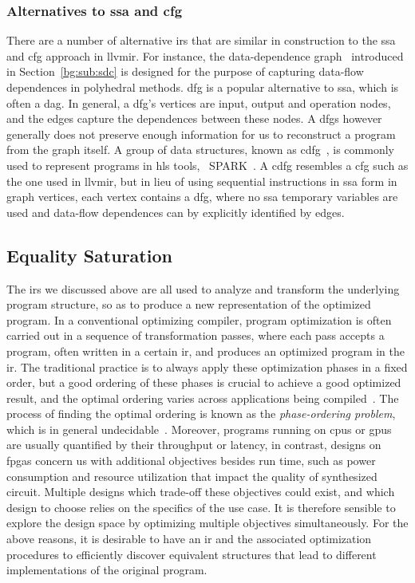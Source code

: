 \subsubsection{Alternatives to \gls{ssa} and \gls{cfg}}

There are a number of alternative \glspl{ir} that are similar in construction
to the \gls{ssa} and \gls{cfg} approach in \gls{llvmir}\@.  For instance, the
data-dependence graph~\cite{rau94} introduced in Section~\ref{bg:sub:sdc} is
designed for the purpose of capturing data-flow dependences in polyhedral
methods.  \Gls{dfg} is a popular alternative to \gls{ssa}, which is often
a \gls{dag}.  In general, a \gls{dfg}'s vertices are input, output and
operation nodes, and the edges capture the dependences between these nodes.
A \glspl{dfg} however generally does not preserve enough information for us
to reconstruct a program from the graph itself.  A group of data structures,
known as \gls{cdfg}~\cite{orailoglu86}, is commonly used to represent programs
in \gls{hls} tools, \eg~SPARK~\cite{gupta04}.  A \gls{cdfg} resembles a
\gls{cfg} such as the one used in \gls{llvmir}, but in lieu of using sequential
instructions in \gls{ssa} form in graph vertices, each vertex contains a
\gls{dfg}, where no \gls{ssa} temporary variables are used and data-flow
dependences can by explicitly identified by edges.


\subsection{Equality Saturation}
\label{bg:sub:equality_saturation}

The \glspl{ir} we discussed above are all used to analyze and transform the
underlying program structure, so as to produce a new representation of the
optimized program.  In a conventional optimizing compiler, program optimization
is often carried out in a sequence of transformation passes, where each pass
accepts a program, often written in a certain \gls{ir}, and produces an
optimized program in the \gls{ir}\@.  The traditional practice is to always
apply these optimization phases in a fixed order, but a good ordering of these
phases is crucial to achieve a good optimized result, and the optimal ordering
varies across applications being compiled~\cite{almagor04}.  The process of
finding the optimal ordering is known as the \emph{phase-ordering problem},
which is in general undecidable~\cite{touati06}.  Moreover, programs running
on \glspl{cpu} or \glspl{gpu} are usually quantified by their throughput or
latency, in contrast, designs on \glspl{fpga} concern us with additional
objectives besides run time, such as power consumption and resource utilization
that impact the quality of synthesized circuit.  Multiple designs which
trade-off these objectives could exist, and which design to choose relies
on the specifics of the use case.  It is therefore sensible to explore the
design space by optimizing multiple objectives simultaneously.  For the above
reasons, it is desirable to have an \gls{ir} and the associated optimization
procedures to efficiently discover equivalent structures that lead to different
implementations of the original program.


